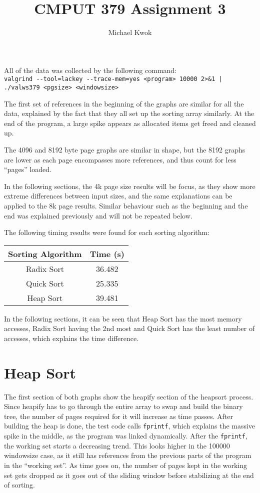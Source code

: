 \documentclass{article}
\title{CMPUT 379 Assignment 3}
\author{Michael Kwok}
\begin{document}
\maketitle
All of the data was collected by the following command:\\
\verb!valgrind --tool=lackey --trace-mem=yes <program> 10000 2>&1 | ./valws379 <pgsize> <windowsize> !

The first set of references in the beginning of the graphs are similar for all the data, explained by the fact that they all set up the sorting array similarly. At the end of the program, a large spike appears as allocated items get freed and cleaned up.

The 4096 and 8192 byte page graphs are similar in shape, but the 8192 graphs are lower as each page encompasses more references, and thus count for less ``pages'' loaded.

In the following sections, the 4k page size results will be focus, as they show more extreme differences between input sizes, and the same explanations can be applied to the 8k page results. Similar behaviour such as the beginning and the end was explained previously and will not be repeated below.

The following timing results were found for each sorting algorithm:

\begin{center}
    \begin{tabular}{ c c }
        \toprule
        Sorting Algorithm & Time (\si{\second}) \\
        \midrule
        Radix Sort        & 36.482              \\
        Quick Sort        & 25.335              \\
        Heap Sort         & 39.481              \\
        \bottomrule
    \end{tabular}
\end{center}

In the following sections, it can be seen that Heap Sort has the most memory accesses, Radix Sort having the 2nd most and Quick Sort has the least number of accesses, which explains the time difference.

\section{Heap Sort}

The first section of both graphs show the heapify section of the heapsort process. Since heapify has to go through the entire array to swap and build the binary tree, the number of pages required for it will increase as time passes. After building the heap is done, the test code calls \verb|fprintf|, which explains the massive spike in the middle, as the program was linked dynamically. After the \verb|fprintf|, the working set starts a decreasing trend. This looks higher in the \num{100000} windowsize case, as it still has references from the previous parts of the program in the ``working set''. As time goes on, the number of pages kept in the working set gets dropped as it goes out of the sliding window before stabilizing at the end of sorting.
\end{document}
